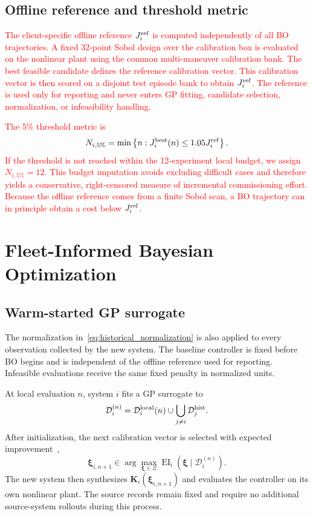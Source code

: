 \documentclass[conference]{IEEEtran}
\newcommand{\rev}[1]{\textcolor{red}{#1}}
\newcommand{\calD}{\mathcal{D}}
\begin{document}
\subsection{Offline reference and threshold metric}
\rev{The client-specific offline reference $J_i^{\rm ref}$ is computed independently of all BO trajectories. A fixed 32-point Sobol design over the calibration box is evaluated on the nonlinear plant using the common multi-maneuver calibration bank. The best feasible candidate defines the reference calibration vector. This calibration vector is then scored on a disjoint test episode bank to obtain $J_i^{\rm ref}$. The reference is used only for reporting and never enters GP fitting, candidate selection, normalization, or infeasibility handling.}

\rev{The 5\% threshold metric is}
\begin{equation}
 N_{i,5\%}=\min\left\{n:J_i^{\rm best}(n)\le1.05J_i^{\rm ref}\right\}.
 \label{eq:n5}
\end{equation}
\rev{If the threshold is not reached within the 12-experiment local budget, we assign $N_{i,5\%}=12$. This budget imputation avoids excluding difficult cases and therefore yields a conservative, right-censored measure of incremental commissioning effort. Because the offline reference comes from a finite Sobol scan, a BO trajectory can in principle obtain a cost below $J_i^{\rm ref}$.}

\section{Fleet-Informed Bayesian Optimization}

\subsection{Warm-started GP surrogate}
The normalization in~\eqref{eq:historical_normalization} is also applied to every observation collected by the new system. The baseline controller is fixed before BO begins and is independent of the offline reference used for reporting. Infeasible evaluations receive the same fixed penalty in normalized units.

At local evaluation $n$, system $i$ fits a GP surrogate to
\begin{equation}
 \calD_i^{(n)}=\calD_i^{\rm local}(n)\cup\bigcup_{j\ne i}\calD_j^{\rm hist}.
 \label{eq:pooled_dataset}
\end{equation}
After initialization, the next calibration vector is selected with expected improvement~\cite{frazier2018tutorial},
\begin{equation}
 \boldsymbol{\xi}_{i,n+1}\in\arg\max_{\boldsymbol{\xi}\in\Xi}\operatorname{EI}_i\left(\boldsymbol{\xi}\mid\calD_i^{(n)}\right).
 \label{eq:ei}
\end{equation}
The new system then synthesizes $\mathbf{K}_i(\boldsymbol{\xi}_{i,n+1})$ and evaluates the controller on its own nonlinear plant. The source records remain fixed and require no additional source-system rollouts during this process.
\end{document}
